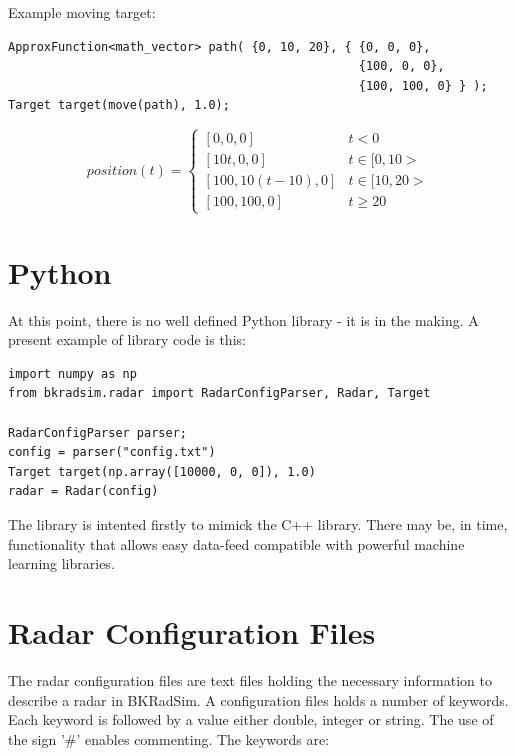 \documentclass[letterpaper]{book}
\begin{document}
Example moving target:
\begin{lstlisting}
ApproxFunction<math_vector> path( {0, 10, 20}, { {0, 0, 0}, 
                                                 {100, 0, 0},
                                                 {100, 100, 0} } );
Target target(move(path), 1.0);
\end{lstlisting}
\begin{equation}
position(t) = \begin{cases} 
                 [0, 0, 0] & t < 0 \\
                 [10t, 0, 0] & t \in [0, 10> \\
                 [100, 10(t-10), 0] & t \in [10, 20>  \\
                 [100, 100, 0] & t \geq 20
              \end{cases}
\end{equation}


\chapter{Python}
At this point, there is no well defined Python library - it is in the making. A present example of library code is this:
\begin{lstlisting}
import numpy as np
from bkradsim.radar import RadarConfigParser, Radar, Target

RadarConfigParser parser;
config = parser("config.txt")
Target target(np.array([10000, 0, 0]), 1.0)
radar = Radar(config)
\end{lstlisting}

The library is intented firstly to mimick the C++ library. There may be, in time, functionality that allows easy data-feed compatible with powerful machine learning libraries.


\chapter{Radar Configuration Files}
\label{chap:configfile}
The radar configuration files are text files holding the necessary information to describe a radar in BKRadSim. A configuration files holds a number of keywords. Each keyword is followed by a value either double, integer or string. The use of the sign '\#' enables commenting. The keywords are:
\end{document}
